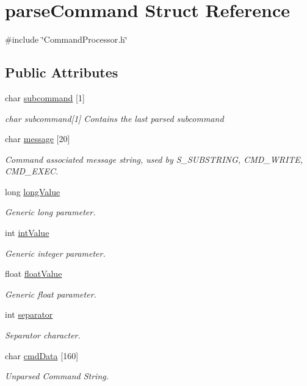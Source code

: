 \hypertarget{structparse_command}{\section{parse\-Command Struct Reference}
\label{structparse_command}
}


{\ttfamily \#include \char`\"{}Command\-Processor.\-h\char`\"{}}

\subsection*{Public Attributes}
\begin{DoxyCompactItemize}
\item 
char \hyperlink{structparse_command_a10312bf6b72a9315a4fb550458bc3ae9}{subcommand} \mbox{[}1\mbox{]}
\begin{DoxyCompactList}\small\item\em char subcommand\mbox{[}1\mbox{]} Contains the last parsed subcommand \end{DoxyCompactList}\item 
char \hyperlink{structparse_command_ab80399acc713a2d31a48dd2db5c7d0a2}{message} \mbox{[}20\mbox{]}
\begin{DoxyCompactList}\small\item\em Command associated message string, used by S\-\_\-\-S\-U\-B\-S\-T\-R\-I\-N\-G, C\-M\-D\-\_\-\-W\-R\-I\-T\-E, C\-M\-D\-\_\-\-E\-X\-E\-C. \end{DoxyCompactList}\item 
long \hyperlink{structparse_command_ad062df88615d7d66ded447dd4ff87bad}{long\-Value}
\begin{DoxyCompactList}\small\item\em Generic long parameter. \end{DoxyCompactList}\item 
int \hyperlink{structparse_command_a022bdea84dc5c07ff20af8690a1aa2e3}{int\-Value}
\begin{DoxyCompactList}\small\item\em Generic integer parameter. \end{DoxyCompactList}\item 
float \hyperlink{structparse_command_a121ded5fdf791ba216ad84cef651fe74}{float\-Value}
\begin{DoxyCompactList}\small\item\em Generic float parameter. \end{DoxyCompactList}\item 
int \hyperlink{structparse_command_a5f5c48be92f3aae7c4b1b71ca750298b}{separator}
\begin{DoxyCompactList}\small\item\em Separator character. \end{DoxyCompactList}\item 
char \hyperlink{structparse_command_a7cb5165cf18cc63d7eed9fa34be4efd8}{cmd\-Data} \mbox{[}160\mbox{]}
\begin{DoxyCompactList}\small\item\em Unparsed Command String. \end{DoxyCompactList}\end{DoxyCompactItemize}



